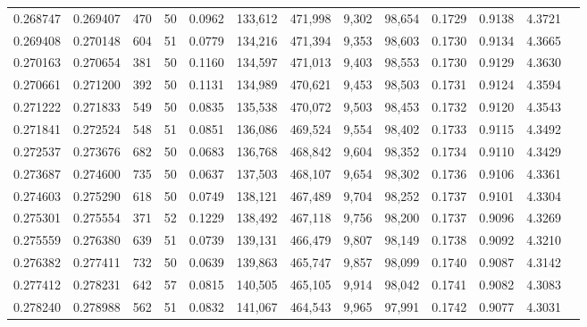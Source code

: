 \begin{tabular}{rrrrrrrrrrrrr}
0.268747 & 0.269407 &   470 &  50 &                                     0.0962 & 133,612 & 471,998 &   9,302 &  98,654 & 0.1729 & 0.9138 & 4.3721 \\
0.269408 & 0.270148 &   604 &  51 &                                     0.0779 & 134,216 & 471,394 &   9,353 &  98,603 & 0.1730 & 0.9134 & 4.3665 \\
0.270163 & 0.270654 &   381 &  50 &                                     0.1160 & 134,597 & 471,013 &   9,403 &  98,553 & 0.1730 & 0.9129 & 4.3630 \\
0.270661 & 0.271200 &   392 &  50 &                                     0.1131 & 134,989 & 470,621 &   9,453 &  98,503 & 0.1731 & 0.9124 & 4.3594 \\
0.271222 & 0.271833 &   549 &  50 &                                     0.0835 & 135,538 & 470,072 &   9,503 &  98,453 & 0.1732 & 0.9120 & 4.3543 \\
0.271841 & 0.272524 &   548 &  51 &                                     0.0851 & 136,086 & 469,524 &   9,554 &  98,402 & 0.1733 & 0.9115 & 4.3492 \\
0.272537 & 0.273676 &   682 &  50 &                                     0.0683 & 136,768 & 468,842 &   9,604 &  98,352 & 0.1734 & 0.9110 & 4.3429 \\
0.273687 & 0.274600 &   735 &  50 &                                     0.0637 & 137,503 & 468,107 &   9,654 &  98,302 & 0.1736 & 0.9106 & 4.3361 \\
0.274603 & 0.275290 &   618 &  50 &                                     0.0749 & 138,121 & 467,489 &   9,704 &  98,252 & 0.1737 & 0.9101 & 4.3304 \\
0.275301 & 0.275554 &   371 &  52 &                                     0.1229 & 138,492 & 467,118 &   9,756 &  98,200 & 0.1737 & 0.9096 & 4.3269 \\
0.275559 & 0.276380 &   639 &  51 &                                     0.0739 & 139,131 & 466,479 &   9,807 &  98,149 & 0.1738 & 0.9092 & 4.3210 \\
0.276382 & 0.277411 &   732 &  50 &                                     0.0639 & 139,863 & 465,747 &   9,857 &  98,099 & 0.1740 & 0.9087 & 4.3142 \\
0.277412 & 0.278231 &   642 &  57 &                                     0.0815 & 140,505 & 465,105 &   9,914 &  98,042 & 0.1741 & 0.9082 & 4.3083 \\
0.278240 & 0.278988 &   562 &  51 &                                     0.0832 & 141,067 & 464,543 &   9,965 &  97,991 & 0.1742 & 0.9077 & 4.3031 \\

\end{tabular}
